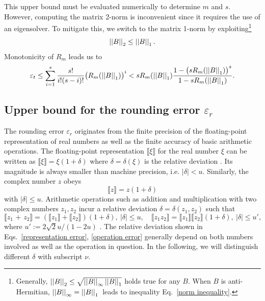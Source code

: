 This upper bound must be evaluated numerically to determine $m$ and $s$. However, computing the matrix 2-norm is inconvenient since it requires the use of an eigensolver. To mitigate this, we switch to the matrix 1-norm by exploiting\footnote{Generally, $\left|\left|B\right|\right|_2\leq\sqrt{\left|\left|B\right|\right|_\infty\left|\left|B\right|\right|_1}$ \cite{wilkinson1994rounding} holds true for any $B$. When $B$ is anti-Hermitian, $\left|\left|B\right|\right|_\infty=\left|\left|B\right|\right|_1$\ leads to inequality Eq.\ \eqref{norm inequality}.}
\begin{equation}
\label{norm inequality}
    \left|\left|B\right|\right|_2\leq\left|\left|B\right|\right|_1.
\end{equation}
Monotonicity of $R_m$ leads us to
\begin{equation}
    \label{truncation}
    \varepsilon_t \leq 
    \sum_{i=1}^{s}\frac{s!}{i!(s-i)!}\big(R_m(\left|\left|B\right|\right|_1)\big)^i
    < sR_m(\left|\left|B\right|\right|_1)\frac{1-\big(sR_m(\left|\left|B\right|\right|_1)\big)^s}{1-sR_m(\left|\left|B\right|\right|_1)}.
\end{equation}


\subsection{Upper bound for the rounding error $\varepsilon_r$}
\label{rounding error upper bound}
The rounding error $\varepsilon_r$ originates from the finite precision of the floating-point representation of real numbers as well as the finite accuracy of basic arithmetic operations. The floating-point representation  $\llbracket \xi \rrbracket$ for the real number $\xi $ can be written as $\llbracket \xi \rrbracket=\xi(1+\delta)$ where $\delta=\delta(\xi)$ is the relative deviation \cite{higham2002accuracy}. Its magnitude is always smaller than machine precision, i.e. $|\delta|<u$. Similarly, the complex number $z$ obeys 
\begin{equation}
    \label{representation error}
    \llbracket z\rrbracket=z(1+\delta)
\end{equation}
with $|\delta|\leq u$. Arithmetic operations such as addition and multiplication with two complex numbers $z_1, z_2$ incur a relative deviation $\delta=\delta(z_1,z_2)$ such that 
\begin{equation}
\label{operation error}
    \llbracket z_1 \text{ + } z_2\rrbracket =(\llbracket z_1 \rrbracket+\llbracket z_2\rrbracket)(1+\delta),\ |\delta|\leq u, \quad\llbracket z_1 z_2 \rrbracket=\llbracket z_1\rrbracket \llbracket z_2\rrbracket(1+\delta),\ |\delta|\leq u',
\end{equation}
where $u':=2\sqrt{2}u/(1-2u)$ \cite{higham2002accuracy}. The relative deviation shown in Eqs.\ \eqref{representation error}, \eqref{operation error} generally depend on both numbers involved as well as the operation in question. In the following, we will distinguish different $\delta$ with subscript $\nu$.

